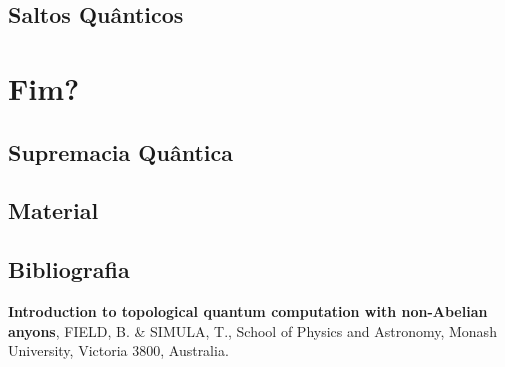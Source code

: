 \documentclass[t]{beamer}
\begin{document}
	\subsection{Saltos Quânticos}
	
	\begin{frame}
	
	\end{frame}	
	
	\section{Fim?}

	\subsection{Supremacia Quântica}
	
	\begin{frame}
	
	\end{frame}	
	
	\begin{frame}{\subsecname}
	
	\end{frame}
	
	\subsection{Material}
	
	\begin{frame}{\subsecname}
	
	\end{frame}
	
	\subsection{Bibliografia}
	
	\begin{frame}{\subsecname}
		
		 \textbf{Introduction to topological quantum computation with non-Abelian anyons}, FIELD, B. \& SIMULA, T., School of Physics and Astronomy, Monash University, Victoria 3800, Australia.
		
		\bibitem{}
	\end{frame}
\end{document}
